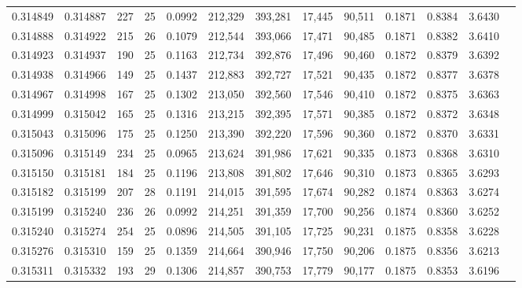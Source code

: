 \begin{tabular}{rrrrrrrrrrrrr}
0.314849 & 0.314887 &   227 &  25 &                                     0.0992 & 212,329 & 393,281 &  17,445 &  90,511 & 0.1871 & 0.8384 & 3.6430 \\
0.314888 & 0.314922 &   215 &  26 &                                     0.1079 & 212,544 & 393,066 &  17,471 &  90,485 & 0.1871 & 0.8382 & 3.6410 \\
0.314923 & 0.314937 &   190 &  25 &                                     0.1163 & 212,734 & 392,876 &  17,496 &  90,460 & 0.1872 & 0.8379 & 3.6392 \\
0.314938 & 0.314966 &   149 &  25 &                                     0.1437 & 212,883 & 392,727 &  17,521 &  90,435 & 0.1872 & 0.8377 & 3.6378 \\
0.314967 & 0.314998 &   167 &  25 &                                     0.1302 & 213,050 & 392,560 &  17,546 &  90,410 & 0.1872 & 0.8375 & 3.6363 \\
0.314999 & 0.315042 &   165 &  25 &                                     0.1316 & 213,215 & 392,395 &  17,571 &  90,385 & 0.1872 & 0.8372 & 3.6348 \\
0.315043 & 0.315096 &   175 &  25 &                                     0.1250 & 213,390 & 392,220 &  17,596 &  90,360 & 0.1872 & 0.8370 & 3.6331 \\
0.315096 & 0.315149 &   234 &  25 &                                     0.0965 & 213,624 & 391,986 &  17,621 &  90,335 & 0.1873 & 0.8368 & 3.6310 \\
0.315150 & 0.315181 &   184 &  25 &                                     0.1196 & 213,808 & 391,802 &  17,646 &  90,310 & 0.1873 & 0.8365 & 3.6293 \\
0.315182 & 0.315199 &   207 &  28 &                                     0.1191 & 214,015 & 391,595 &  17,674 &  90,282 & 0.1874 & 0.8363 & 3.6274 \\
0.315199 & 0.315240 &   236 &  26 &                                     0.0992 & 214,251 & 391,359 &  17,700 &  90,256 & 0.1874 & 0.8360 & 3.6252 \\
0.315240 & 0.315274 &   254 &  25 &                                     0.0896 & 214,505 & 391,105 &  17,725 &  90,231 & 0.1875 & 0.8358 & 3.6228 \\
0.315276 & 0.315310 &   159 &  25 &                                     0.1359 & 214,664 & 390,946 &  17,750 &  90,206 & 0.1875 & 0.8356 & 3.6213 \\
0.315311 & 0.315332 &   193 &  29 &                                     0.1306 & 214,857 & 390,753 &  17,779 &  90,177 & 0.1875 & 0.8353 & 3.6196 \\

\end{tabular}
